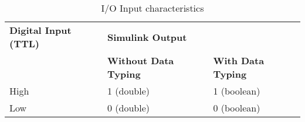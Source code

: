 \begin{table}[H]
    \centering
    \begin{tabular}{|l|ll|}
        \hline
        \rowcolor[HTML]{34CDF9} 
        \textbf{Digital Input (TTL)} & \multicolumn{2}{l|}{\cellcolor[HTML]{34CDF9}\textbf{Simulink Output}}                                 \\
        \rowcolor[HTML]{34CDF9} 
        \textbf{}                    & \multicolumn{1}{l|}{\cellcolor[HTML]{34CDF9}\textbf{Without Data Typing}} & \textbf{With Data Typing} \\ \hline
        High & \multicolumn{1}{l|}{1 (double)} & 1 (boolean) \\
        Low  & \multicolumn{1}{l|}{0 (double)} & 0 (boolean) \\ \hline
    \end{tabular}
\caption{I/O Input characteristics}
\label{I/O Input characteristics}
\end{table}